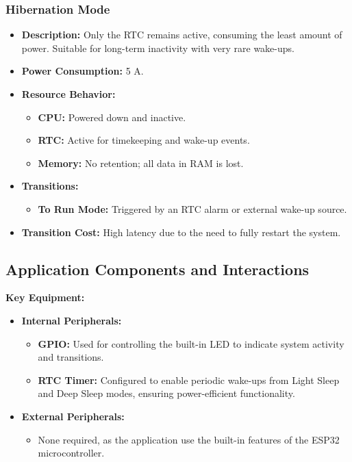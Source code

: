 \documentclass[a4paper, 11pt]{article}
\begin{document}
    \subsubsection*{Hibernation Mode}
    \begin{itemize}
        \item \textbf{Description:} Only the RTC remains active, consuming the least amount of power. Suitable for long-term inactivity with very rare wake-ups.
        \item \textbf{Power Consumption:} 5 \textmu A.
        \item \textbf{Resource Behavior:}
        \begin{itemize}
            \item \textbf{CPU:} Powered down and inactive.
            \item \textbf{RTC:} Active for timekeeping and wake-up events.
            \item \textbf{Memory:} No retention; all data in RAM is lost.
        \end{itemize}
        \item \textbf{Transitions:}
        \begin{itemize}
            \item \textbf{To Run Mode:} Triggered by an RTC alarm or external wake-up source.
        \end{itemize}
        \item \textbf{Transition Cost:} High latency due to the need to fully restart the system.
    \end{itemize}
    
    \subsection{Application Components and Interactions}

    \textbf{Key Equipment:}
    \begin{itemize}
        \item \textbf{Internal Peripherals:}
        \begin{itemize}
            \item \textbf{GPIO:} Used for controlling the built-in LED to indicate system activity and transitions.
            \item \textbf{RTC Timer:} Configured to enable periodic wake-ups from Light Sleep and Deep Sleep modes, ensuring power-efficient functionality.
        \end{itemize}
        \item \textbf{External Peripherals:}
        \begin{itemize}
            \item None required, as the application use the built-in features of the ESP32 microcontroller.
        \end{itemize}
    \end{itemize}
    
\end{document}
